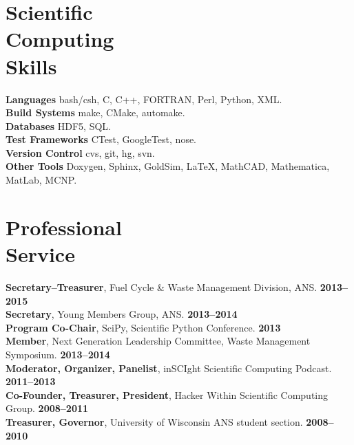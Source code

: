 \documentclass[margin,line]{resume}
\begin{document}
\begin{resume}
    \section{\mysidestyle Scientific\\Computing\\Skills} 
                \textbf{Languages} \hfill bash/csh, C, C++, FORTRAN, Perl, Python, XML.\vspace{.5mm}\\%
                \textbf{Build Systems} \hfill make, CMake, automake.\vspace{.5mm}\\%
                \textbf{Databases} \hfill HDF5, SQL.\vspace{.5mm}\\%
                \textbf{Test Frameworks} \hfill CTest, GoogleTest, nose.\vspace{.5mm}\\%
                \textbf{Version Control} \hfill cvs, git, hg, svn.\vspace{.5mm}\\%
                \textbf{Other Tools} \hfill Doxygen, Sphinx, GoldSim, \LaTeX, MathCAD, Mathematica, MatLab, MCNP.\vspace{.5mm}%

    \vspace{-3mm}
    \section{\mysidestyle Professional\\Service}
		\textbf{Secretary--Treasurer}, Fuel Cycle \& Waste Management Division, ANS. \hfill \textbf{2013--2015}\vspace{.5mm}\\%
		\textbf{Secretary}, Young Members Group, ANS. \hfill \textbf{2013--2014}\vspace{.5mm}\\%
		\textbf{Program Co-Chair}, SciPy, Scientific Python Conference. \hfill \textbf{2013}\vspace{.5mm}\\%
		\textbf{Member}, Next Generation Leadership Committee, Waste Management Symposium. \hfill \textbf{2013--2014}\vspace{.5mm}\\%
		\textbf{Moderator, Organizer, Panelist}, inSCIght Scientific Computing Podcast. \hfill \textbf{2011--2013}\vspace{.5mm}\\%
		\textbf{Co-Founder, Treasurer, President}, Hacker Within Scientific Computing Group. \hfill \textbf{2008--2011}\vspace{.5mm}\\%
		\textbf{Treasurer, Governor}, University of Wisconsin ANS student section. \hfill \textbf{2008--2010}\vspace{.5mm}%


\end{resume}
\end{document}

